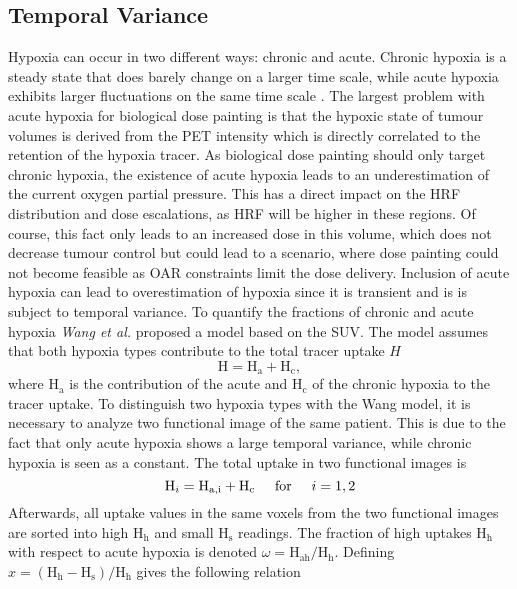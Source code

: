\subsection{Temporal Variance}\label{chap:wang}
Hypoxia can occur in two different ways: chronic and acute. Chronic hypoxia is a steady state that does barely change on a larger time scale, while acute hypoxia exhibits larger fluctuations on the same time scale \cite{pmid9783887, pmid18086391,pmid19203843, pmid15234030, pmid17543402, pmid16098619, pmid17674980, pmid18313529}. The largest problem with acute hypoxia for biological dose painting is that the hypoxic state of tumour volumes is derived from the PET intensity which is directly correlated to the retention of the hypoxia tracer. As biological dose painting should only target chronic hypoxia, the existence of acute hypoxia leads to an underestimation of the current oxygen partial pressure. This has a direct impact on the HRF distribution and dose escalations, as HRF will be higher in these regions. Of course, this fact only leads to an increased dose in this volume, which does not decrease tumour control but could lead to a scenario, where dose painting could not become feasible as OAR constraints limit the dose delivery. Inclusion of acute hypoxia can lead to overestimation of hypoxia since it is transient and is is subject to temporal variance. To quantify the fractions of chronic and acute hypoxia \textit{Wang et al.} \cite{pmid19928070} proposed a model based on the SUV. The model assumes that both hypoxia types contribute to the total tracer uptake $H$
\begin{equation}
\mathrm{H} = \mathrm{H}_\mathrm{a} + \mathrm{H}_\mathrm{c},
\end{equation}
where $ \mathrm{H}_\mathrm{a}$ is the contribution of the acute and $ \mathrm{H}_\mathrm{c}$ of the chronic hypoxia to the tracer uptake. To distinguish two hypoxia types with the Wang model, it is necessary to analyze two functional image of the same patient. This is due to the fact that only acute hypoxia shows a large temporal variance, while chronic hypoxia is seen as a constant. The total uptake in two functional images is
\begin{equation}
\mathrm{H}_i = \mathrm{H}_\mathrm{a,i} + \mathrm{H}_\mathrm{c} \hspace{0.5cm}\mathrm{for}\hspace{0.5cm}i=1,2
\end{equation}
Afterwards, all uptake values in the same voxels from the two functional images are sorted into high H$_\mathrm{h}$ and small H$_\mathrm{s}$ readings. The fraction of high uptakes H$_\mathrm{h}$ with respect to acute hypoxia is denoted $\omega = \mathrm{H}_\mathrm{ah}/\mathrm{H}_\mathrm{h}$. Defining $x = (\mathrm{H}_\mathrm{h} - \mathrm{H}_\mathrm{s})/\mathrm{H}_\mathrm{h}$ gives the following relation

